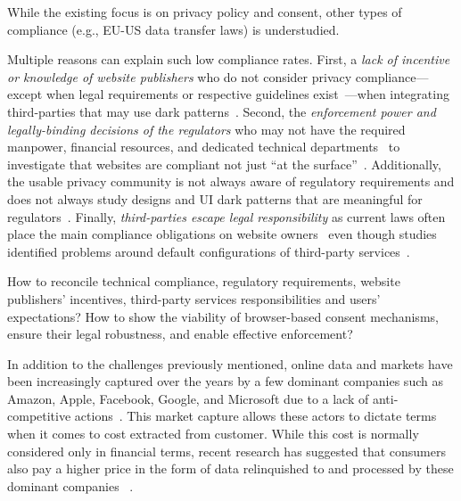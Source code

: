 \begin{opbox}
While the existing focus is on privacy policy and consent, other types of compliance (e.g., EU-US data transfer laws) is understudied.
\end{opbox}

Multiple reasons can explain such low compliance rates. First, a \textit{lack of incentive or knowledge of website publishers} who do not consider privacy compliance---except when legal requirements or respective guidelines exist~\cite{utzPrivacyRarelyConsidered2023,Stov-etal-23-PETs}---when integrating third-parties that may use dark patterns~\cite{tothDarkPatternsManipulation2022,grayDarkPatternsLegal2021}. Second, the \textit{enforcement power and legally-binding decisions of the regulators} who may not have the required manpower, financial resources, and dedicated technical departments~\cite{edpbContributionEDPBReport2023} to investigate that websites are compliant not just ``at the surface''~\cite{kyiInvestigatingDeceptiveDesign2023}. Additionally, the usable privacy community is not always aware of regulatory requirements and does not always study designs and UI dark patterns that are meaningful for regulators~\cite{Bielova2024-zr}. 
Finally, \textit{third-parties escape legal responsibility} as current laws often place the main compliance obligations on website owners~\cite{santosConsentManagementPlatforms2021} even though  studies identified problems around default configurations of third-party services~\cite{Koch-etal-25-PETs,Rodr-etal-25-PETs}.

\begin{opbox}
How to reconcile technical compliance, regulatory requirements, 
website publishers' incentives, third-party services responsibilities 
and users’ expectations?
How to show the viability of browser-based consent mechanisms, ensure their legal robustness, and enable effective enforcement?
\end{opbox}


In addition to the challenges previously mentioned, online data and markets have been increasingly captured over the years by a few dominant companies such as Amazon, Apple, Facebook, Google, and Microsoft due to a lack of anti-competitive actions~\cite{TargetedAdvertisingAutorite2025}. 
This market capture allows these actors to dictate terms when it comes to cost extracted from customer. While this cost is normally considered only in financial terms, recent research has suggested that consumers also pay a higher price in the form of data relinquished to and processed by these dominant companies ~\cite{khanAmazonsAntitrustParadox2017,munirGooglesChromeAntitrust2024}.


